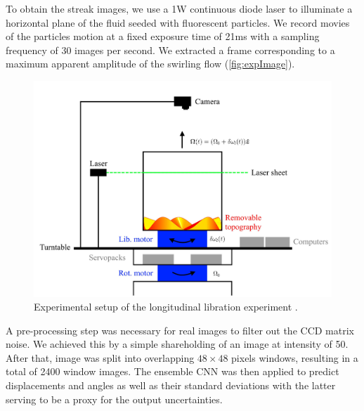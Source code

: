 \documentclass{svjour3}                     %
\begin{document}
To obtain the streak images, we use a 1W continuous diode laser to illuminate a horizontal plane of the fluid seeded with fluorescent particles. We record movies of the particles motion at a fixed exposure time of 21ms with a sampling frequency of 30 images per second. We extracted a frame corresponding to a maximum apparent amplitude of the swirling flow (\ref{fig:expImage}).
     
\begin{figure}
	\includegraphics[width=\textwidth]{figs/figureExperiment.jpg}
	\caption{Experimental setup of the longitudinal libration experiment \cite{MeisterMSC}.}
	\label{fig:MeisterMSC}
\end{figure}

A pre-processing step was necessary for real images to filter out the CCD matrix noise. We achieved this by a simple shareholding of an image at intensity of 50. After that, image was split into overlapping $48\times 48$ pixels windows, resulting in a total of 2400 window images. The ensemble CNN was then applied to predict displacements and angles as well as their standard deviations with the latter serving to be a proxy for the output uncertainties. 
\end{document}
